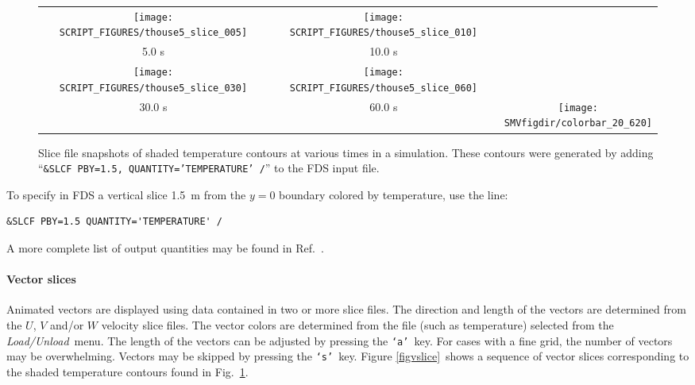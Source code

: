 \documentclass[11pt,twoside]{book}
\newcommand{\figheightAbar}{2.2in}
\begin{document}
\begin{figure}[bph]
\begin{center}
\begin{tabular}{ccc}
\texttt{[image: SCRIPT\_FIGURES/thouse5\_slice\_005]}&
\texttt{[image: SCRIPT\_FIGURES/thouse5\_slice\_010]}\\
5.0 s&10.0 s\\
\texttt{[image: SCRIPT\_FIGURES/thouse5\_slice\_030]}&
\texttt{[image: SCRIPT\_FIGURES/thouse5\_slice\_060]}&\\
30.0 s&60.0 s
&\raisebox{0.0ex}[0pt]{\texttt{[image: \\SMVfigdir/colorbar\_20\_620]}}\\
\end{tabular}
\caption [Slice file snapshots of shaded temperature contours.]
{Slice file snapshots of shaded temperature contours at various
times in a simulation. These contours were generated by adding
``{\tt \&SLCF PBY=1.5, QUANTITY='TEMPERATURE' /}'' to the FDS
input file. }
\label{figslice}%
\end{center}
\end{figure}

\indent To specify in FDS a vertical slice 1.5~m from the $y=0$
boundary colored by temperature, use the line:
\begin{lstlisting}[basicstyle=\ttfamily]
&SLCF PBY=1.5 QUANTITY='TEMPERATURE' /
\end{lstlisting}
A more complete list of output quantities may be found in
Ref.~\cite{FDS_Users_Guide}.

\paragraph{Vector slices}Animated vectors are displayed using data contained in two or more
slice files.  The direction and length of the vectors are
determined from the $U$, $V$ and/or $W$ velocity slice files. The
vector colors are determined from the file (such as temperature)
selected from the {\em Load/Unload}\ menu. The length of the
vectors can be adjusted by pressing the {\tt `a'}\ key. For cases
with a fine grid, the number of vectors may be overwhelming.
Vectors may be skipped by pressing the {\tt `s'}\ key.  Figure
\ref{figvslice}\ shows a sequence of vector slices corresponding to
the shaded temperature contours found in Fig.~\ref{figslice}.
\end{document}
